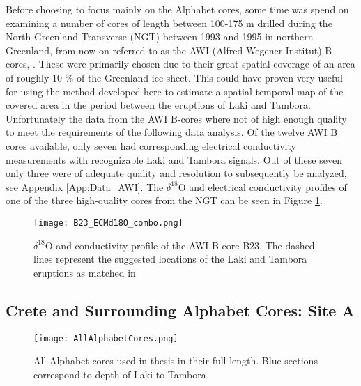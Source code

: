 \documentclass[../../CompleteThesis2/Complete_2ndDraft]{subfiles}
\begin{document}
Before choosing to focus mainly on the Alphabet cores, some time was spend on examining a number of cores of length between 100-175 m drilled during the North Greenland Transverse (NGT) between 1993 and 1995 in northern Greenland, from now on referred to as the AWI (Alfred-Wegener-Institut) B-cores, \cite[Weissbach et al. 2016]{Weissbach2016}. These were primarily chosen due to their great spatial coverage of an area of roughly 10 \% of the Greenland ice sheet. This could have proven very useful for using the method developed here to estimate a spatial-temporal map of the covered area in the period between the eruptions of Laki and Tambora. Unfortunately the data from the AWI B-cores where not of high enough quality to meet the requirements of the following data analysis. Of the twelve AWI B cores available, only seven had corresponding electrical conductivity measurements with recognizable Laki and Tambora signals. Out of these seven only three were of adequate quality and resolution to subsequently be analyzed, see Appendix \ref{App:Data_AWI}. The $\delta^{18}$O and electrical conductivity profiles of one of the three high-quality cores from the NGT can be seen in Figure \ref{fig:B23_ECMd18O_combo}.

\begin{figure}[h]
	\centering
	\texttt{[image: B23\_ECMd18O\_combo.png]}
	\caption[]{\footnotesize $\delta^{18}$O and conductivity profile of the AWI B-core B23. The dashed lines represent the suggested locations of the Laki and Tambora eruptions as matched in \cite[Weissbach et al. 2016]{Weissbach2016}}
	\label{fig:B23_ECMd18O_combo}
\end{figure}


\subsection[Crete Area][Crete Area]{Crete and Surrounding Alphabet Cores: Site A}
\label{Subsec:Data_Selection_Alhabet}

\begin{figure}[h]
	\centering
	\texttt{[image: AllAlphabetCores.png]}
	\caption[]{\footnotesize All Alphabet cores used in thesis in their full length. Blue sections correspond to depth of Laki to Tambora}
	\label{fig:AllAlphabetCores}
\end{figure}
\end{document}

